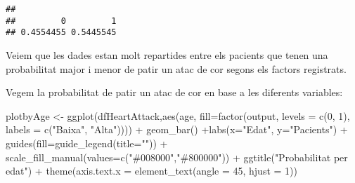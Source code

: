 \documentclass[
]{article}
\newenvironment{Shaded}{\begin{snugshade}}{\end{snugshade}}
\newcommand{\AttributeTok}[1]{\textcolor[rgb]{0.80,0.80,0.80}{#1}}
\newcommand{\DecValTok}[1]{\textcolor[rgb]{0.86,0.86,0.80}{#1}}
\newcommand{\FunctionTok}[1]{\textcolor[rgb]{0.94,0.94,0.56}{#1}}
\newcommand{\NormalTok}[1]{\textcolor[rgb]{0.80,0.80,0.80}{#1}}
\newcommand{\OtherTok}[1]{\textcolor[rgb]{0.94,0.94,0.56}{#1}}
\newcommand{\SpecialCharTok}[1]{\textcolor[rgb]{0.86,0.64,0.64}{#1}}
\newcommand{\StringTok}[1]{\textcolor[rgb]{0.80,0.58,0.58}{#1}}
\begin{document}
\begin{verbatim}
## 
##         0         1 
## 0.4554455 0.5445545
\end{verbatim}

Veiem que les dades estan molt repartides entre els pacients que tenen
una probabilitat major i menor de patir un atac de cor segons els
factors registrats.

Vegem la probabilitat de patir un atac de cor en base a les diferents
variables:

\begin{Shaded}
\begin{Highlighting}[]
\NormalTok{plotbyAge }\OtherTok{\textless{}{-}} \FunctionTok{ggplot}\NormalTok{(dfHeartAttack,}\FunctionTok{aes}\NormalTok{(age, }\AttributeTok{fill=}\FunctionTok{factor}\NormalTok{(output, }\AttributeTok{levels =} \FunctionTok{c}\NormalTok{(}\DecValTok{0}\NormalTok{, }\DecValTok{1}\NormalTok{), }\AttributeTok{labels =} \FunctionTok{c}\NormalTok{(}\StringTok{"Baixa"}\NormalTok{, }\StringTok{"Alta"}\NormalTok{)))) }\SpecialCharTok{+} 
                    \FunctionTok{geom\_bar}\NormalTok{() }\SpecialCharTok{+}\FunctionTok{labs}\NormalTok{(}\AttributeTok{x=}\StringTok{"Edat"}\NormalTok{, }\AttributeTok{y=}\StringTok{"Pacients"}\NormalTok{) }\SpecialCharTok{+} 
                    \FunctionTok{guides}\NormalTok{(}\AttributeTok{fill=}\FunctionTok{guide\_legend}\NormalTok{(}\AttributeTok{title=}\StringTok{""}\NormalTok{)) }\SpecialCharTok{+}
                  \FunctionTok{scale\_fill\_manual}\NormalTok{(}\AttributeTok{values=}\FunctionTok{c}\NormalTok{(}\StringTok{"\#008000"}\NormalTok{,}\StringTok{"\#800000"}\NormalTok{)) }\SpecialCharTok{+} 
                    \FunctionTok{ggtitle}\NormalTok{(}\StringTok{"Probabilitat per edat"}\NormalTok{) }\SpecialCharTok{+}
          \FunctionTok{theme}\NormalTok{(}\AttributeTok{axis.text.x =} \FunctionTok{element\_text}\NormalTok{(}\AttributeTok{angle =} \DecValTok{45}\NormalTok{, }\AttributeTok{hjust =} \DecValTok{1}\NormalTok{))}


\end{Highlighting}
\end{Shaded}
\end{document}
